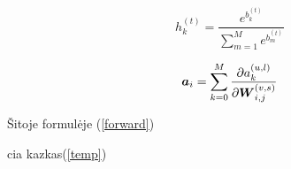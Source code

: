 \begin{equation}\label{eq:h_new_calc}
  h_k^{(t)} = \frac{e^{b_k^{(t)}}}{\sum_{m=1}^M e^{b_m^{(t)}}}
\end{equation}






\begin{equation} \label{eq:forward}
  \text{\boldmath $a$}_i = \sum_{k=0}^{M} \frac{\partial a_{k}^{(u,l)}}{\partial \text{\boldmath $W$}_{i,j}^{(v,s)}}
\end{equation}


Šitoje formulėje (\ref{forward})

cia kazkas(\ref{temp})




